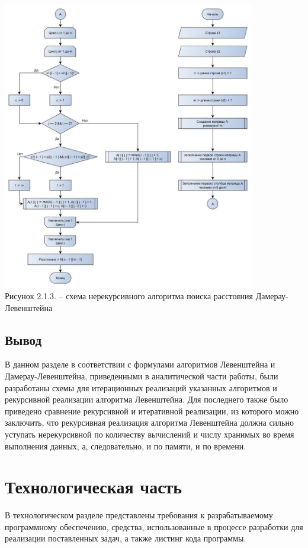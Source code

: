 \documentclass{article}
\begin{document}
\\
	\\	
	\includegraphics[width=11cm]{b}\\
	Рисунок 2.1.3. – схема нерекурсивного алгоритма поиска расстояния Дамерау-Левенштейна
\normalsize

\newpage
\subsection{Вывод}
\label{sec:analitics:construct}

В данном разделе в соответствии с формулами алгоритмов Левенштейна и Дамерау-Левенштейна, приведенными в аналитической части работы, были разработаны схемы для итерационных реализаций указанных алгоритмов и рекурсивной реализации алгоритма Левенштейна. Для последнего также было приведено сравнение рекурсивной и итеративной реализации, из которого можно заключить, что рекурсивная реализация алгоритма Левенштейна должна сильно уступать нерекурсивной по количеству вычислений и числу хранимых во время выполнения данных, а, следовательно, и по памяти, и по времени.

\newpage
\section{Технологическая часть}
\label{sec:technologicalt}

В технологическом разделе представлены требования к разрабатываемому программному обеспечению, средства, использованные в процессе разработки для реализации поставленных задач, а также листинг кода программы.
\end{document}
